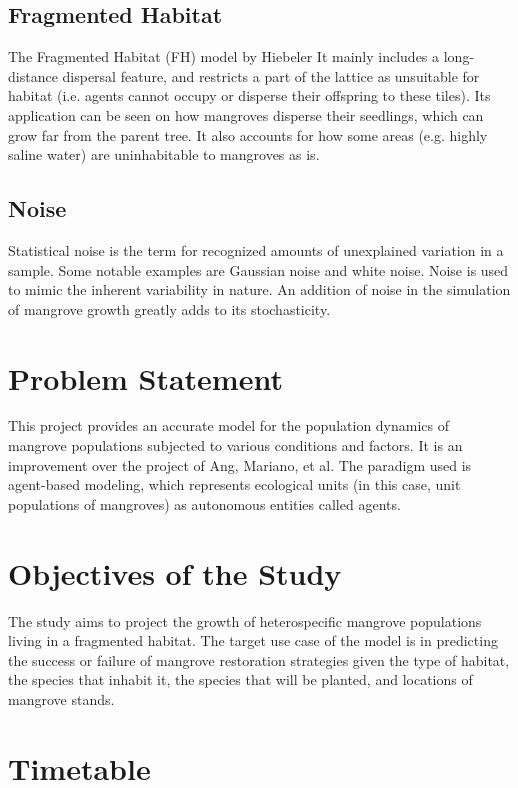 \documentclass[14pt,letterpaper]{article}
\begin{document}
\subsection{Fragmented Habitat}
The Fragmented Habitat (FH) model by Hiebeler \cite{hiebelerfragmented}
It mainly includes a long-distance dispersal feature, and restricts a part of the lattice as unsuitable for habitat (i.e. agents cannot occupy or disperse their offspring to these tiles).
Its application can be seen on how mangroves disperse their seedlings, which can grow far from the parent tree. It also accounts for how some areas (e.g. highly saline water)
are uninhabitable to mangroves as is.

\subsection{Noise}
Statistical noise is the term for recognized amounts of unexplained variation in a sample.
Some notable examples are Gaussian noise and white noise. Noise is used to mimic the 
inherent variability in nature. An addition of noise in the simulation of mangrove growth greatly
adds to its stochasticity.

\section{Problem Statement}
This project provides an accurate model for the population dynamics of mangrove
populations subjected to various conditions and factors. It is an improvement over
the project of Ang, Mariano, et al.\cite{mangrovesAngMariano}
The paradigm used is agent-based modeling, which represents ecological units (in this case, unit
populations of mangroves) as autonomous entities called agents.


\section{Objectives of the Study}
The study aims to project the growth of heterospecific mangrove populations	living in a fragmented habitat. The target use case of the model is in predicting the success or failure of mangrove restoration strategies given the type of habitat, the species that inhabit it, the species that will be planted, and locations of mangrove stands.



\section{Timetable}
\end{document}

